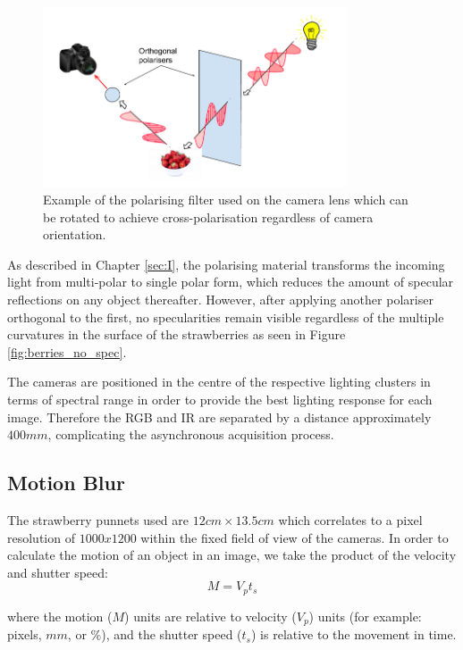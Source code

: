 \documentclass[fleqn,twoside,12pt]{report}
\begin{document}
\begin{figure}[h]
	\centering
	\includegraphics[width=0.8\textwidth]{cross-polariser.png}
	\caption{Example of the polarising filter used on the camera lens which can be rotated to achieve cross-polarisation regardless of camera orientation.}
	\label{fig:nd_filters}
\end{figure}

As described in Chapter \ref{sec:I}, the polarising material transforms the incoming light from multi-polar to single polar form, which reduces the amount of specular reflections on any object thereafter. However, after applying another polariser orthogonal to the first, no specularities remain visible regardless of the multiple curvatures in the surface of the strawberries as seen in Figure \ref{fig:berries_no_spec}. 


The cameras are positioned in the centre of the respective lighting clusters in terms of spectral range in order to provide the best lighting response for each image. Therefore the RGB and IR are separated by a distance approximately $400mm$, complicating the asynchronous acquisition process.



\subsection{Motion Blur} 

The strawberry punnets used are $12cm\times 13.5cm$ which correlates to a pixel resolution of $1000x1200$ within the fixed field of view of the cameras. In order to calculate the motion of an object in an image, we take the product of the velocity and shutter speed:
\begin{equation}
M = V_p t_s
\label{eq:motion}
\end{equation}  

where the motion ($M$) units are relative to velocity ($V_p$) units (for example: pixels, $mm$, or $\%$), and the shutter speed ($t_s$) is relative to the movement in time. 
\end{document}
